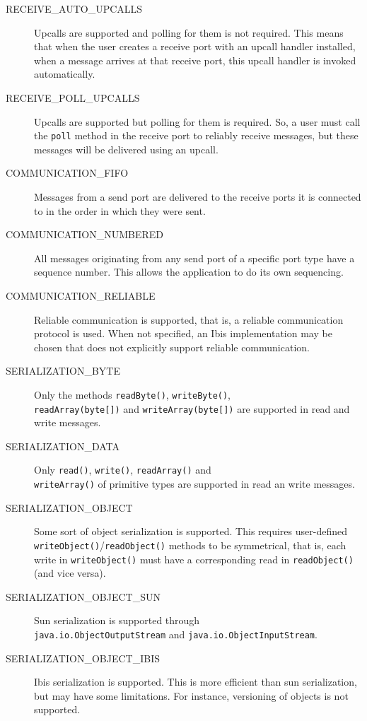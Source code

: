\documentclass[10pt]{article}
\begin{document}
\begin{description}
\item[RECEIVE\_AUTO\_UPCALLS]
Upcalls are supported and polling for them is not required.
This means that when the user creates a receive port with an upcall
handler installed, when a message arrives at that receive port, 
this upcall handler is invoked automatically.

\item[RECEIVE\_POLL\_UPCALLS]
Upcalls are supported but polling for them is required. So, a user must
call the \texttt{poll} method in the receive port to reliably receive
messages, but these messages will be delivered using an upcall.

\item[COMMUNICATION\_FIFO]
Messages from a send port are delivered to the receive ports it is
connected to in the order in which they were sent.

\item[COMMUNICATION\_NUMBERED]
All messages originating from any send port of a specific port type have
a sequence number. This allows the application to do its own sequencing.

\item[COMMUNICATION\_RELIABLE] 
Reliable communication is supported, that is, a reliable communication
protocol is used.  When not specified, an Ibis implementation may be
chosen that does not explicitly support reliable communication.

\item[SERIALIZATION\_BYTE]
Only the methods \texttt{readByte()}, \texttt{writeByte()}, \\
\texttt{readArray(byte[])} and \texttt{writeArray(byte[])} are
supported in read and write messages.

\item[SERIALIZATION\_DATA]
Only \texttt{read()}, \texttt{write()}, 
\texttt{readArray()} and \\
 \texttt{writeArray()} of primitive types are
supported in read an write messages.

\item[SERIALIZATION\_OBJECT]
Some sort of object serialization is supported.
This requires user-defined
\texttt{writeObject()}/\texttt{readObject()} methods to be symmetrical,
that is,
each write in \texttt{writeObject()} must have a corresponding read
in \texttt{readObject()} (and vice versa).

\item[SERIALIZATION\_OBJECT\_SUN]
Sun serialization is supported through \\
\texttt{java.io.ObjectOutputStream} and
\texttt{java.io.ObjectInputStream}.

\item[SERIALIZATION\_OBJECT\_IBIS]
Ibis serialization is supported. This is more efficient than sun
serialization, but may have some limitations. For instance, versioning
of objects is not supported.

\end{description}
\end{document}
